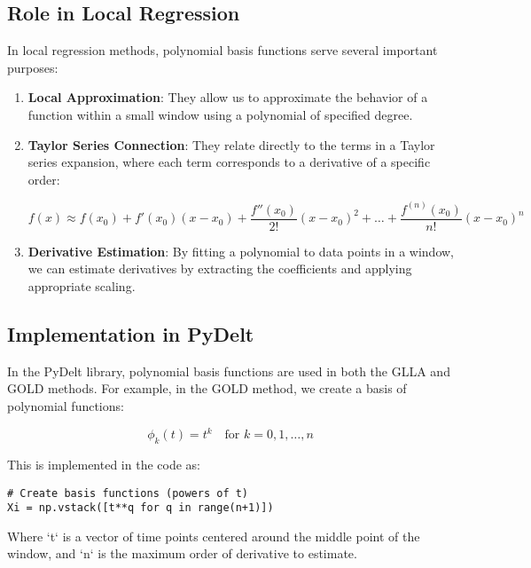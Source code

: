\documentclass{article}
\begin{document}
\subsection{Role in Local Regression}

In local regression methods, polynomial basis functions serve several important purposes:

\begin{enumerate}
    \item \textbf{Local Approximation}: They allow us to approximate the behavior of a function within a small window using a polynomial of specified degree.
    
    \item \textbf{Taylor Series Connection}: They relate directly to the terms in a Taylor series expansion, where each term corresponds to a derivative of a specific order:
    
    \begin{equation}
    f(x) \approx f(x_0) + f'(x_0)(x-x_0) + \frac{f''(x_0)}{2!}(x-x_0)^2 + \ldots + \frac{f^{(n)}(x_0)}{n!}(x-x_0)^n
    \end{equation}
    
    \item \textbf{Derivative Estimation}: By fitting a polynomial to data points in a window, we can estimate derivatives by extracting the coefficients and applying appropriate scaling.
\end{enumerate}

\subsection{Implementation in PyDelt}

In the PyDelt library, polynomial basis functions are used in both the GLLA and GOLD methods. For example, in the GOLD method, we create a basis of polynomial functions:

\begin{equation}
\phi_k(t) = t^k \quad \text{for } k = 0, 1, \ldots, n
\end{equation}

This is implemented in the code as:

\begin{verbatim}
# Create basis functions (powers of t)
Xi = np.vstack([t**q for q in range(n+1)])
\end{verbatim}

Where `t` is a vector of time points centered around the middle point of the window, and `n` is the maximum order of derivative to estimate.
\end{document}
